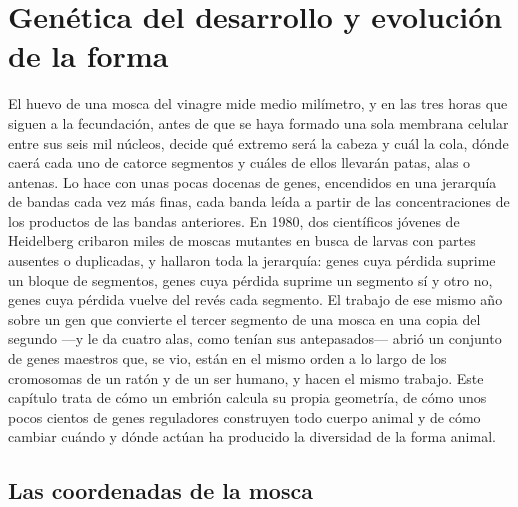 \chapter{Genética del desarrollo y evolución de la forma}\label{ch:b3:developmental-genetics}

El huevo de una mosca del vinagre mide medio milímetro, y en las tres
horas que siguen a la fecundación, antes de que se haya formado una
sola membrana celular entre sus seis mil núcleos, decide qué extremo
será la cabeza y cuál la cola, dónde caerá cada uno de catorce
segmentos y cuáles de ellos llevarán patas, alas o antenas. Lo hace con
unas pocas docenas de genes, encendidos en una jerarquía de bandas cada
vez más finas, cada banda leída a partir de las concentraciones de los
productos de las bandas anteriores. En 1980, dos científicos jóvenes de
Heidelberg cribaron miles de moscas mutantes en busca de larvas con
partes ausentes o duplicadas, y hallaron toda la jerarquía: genes cuya
pérdida suprime un bloque de segmentos, genes cuya pérdida suprime un
segmento sí y otro no, genes cuya pérdida vuelve del revés cada
segmento. El trabajo de ese mismo año sobre un gen que convierte el
tercer segmento de una mosca en una copia del segundo ---y le da cuatro
alas, como tenían sus antepasados--- abrió un conjunto de genes
maestros que, se vio, están en el mismo orden a lo largo de los
cromosomas de un ratón y de un ser humano, y hacen el mismo trabajo.
Este capítulo trata de cómo un embrión calcula su propia geometría, de
cómo unos pocos cientos de genes reguladores construyen todo cuerpo
animal y de cómo cambiar cuándo y dónde actúan ha producido la
diversidad de la forma animal.

\section{Las coordenadas de la mosca}

